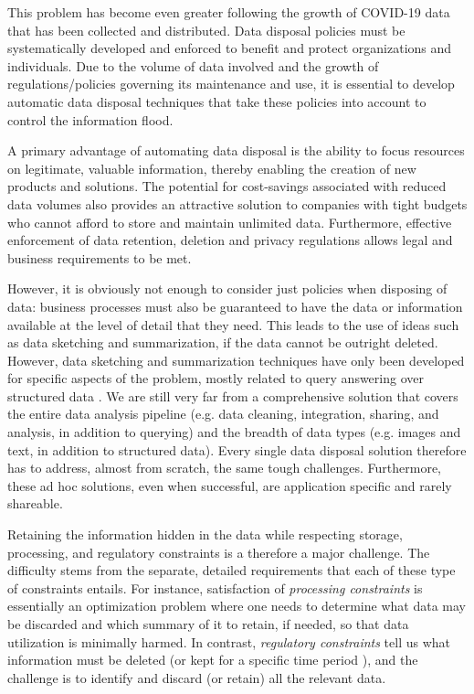 \documentclass[11pt,dvipdfm]{article}
\begin{document}
This problem has become even greater following the growth of COVID-19 data that has been collected and distributed. Data disposal policies must be systematically developed and enforced to benefit and protect organizations and individuals. 
Due to the volume of data involved and the growth of regulations/policies governing its maintenance and use, it is essential to develop automatic data disposal techniques that take these policies into account to control the information flood.  



A primary advantage of automating data disposal is the ability to focus resources on legitimate, valuable information, thereby enabling the creation of new products and solutions. 
The potential for cost-savings associated with reduced data volumes also provides an attractive solution to companies with tight budgets who cannot afford to store and maintain unlimited data. Furthermore, effective enforcement of data retention, deletion and privacy regulations allows legal and business requirements to be met.


However, it is obviously not enough to consider just policies when disposing of data:  business processes must also be guaranteed to have the data or information available at the level of detail that they need. This leads to the use of ideas such as data sketching and summarization, if the data cannot be outright deleted. However, data  sketching and summarization techniques have only been developed for specific aspects of the problem, mostly related to query answering over structured data \cite{apq,streaming,summerization,compression,amnesia}.  We are still very far from a comprehensive solution that covers the entire data analysis pipeline (e.g. data cleaning, integration, sharing, and analysis, in addition to querying) and the breadth of data types (e.g. images and text, in addition to structured data). Every single data disposal solution therefore has to address, almost from scratch, the same tough challenges. Furthermore, these ad hoc solutions, even when successful, are application specific and rarely shareable.

Retaining the information hidden in the data while respecting storage,  processing, and regulatory constraints is a therefore a major challenge. 
The difficulty stems from the separate, detailed requirements that each of these type of constraints entails. For instance,
satisfaction of {\em processing constraints} is essentially an optimization
problem where one needs to determine what data may be discarded and which summary of it to retain, if needed, so that data utilization is minimally harmed. In contrast, {\em regulatory constraints} tell us what information must be deleted (or kept for a specific time period \cite{WikipediaRetentionPolicy}), and the
challenge is to identify and discard (or retain) all the relevant data. 
\end{document}
